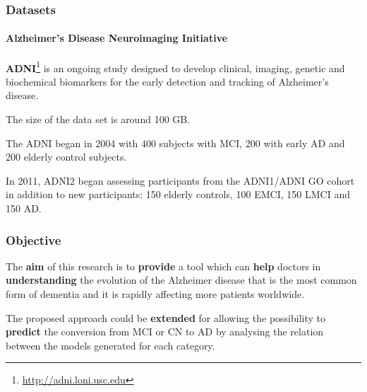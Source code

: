 \begin{frame}
	\frametitle{Datasets}
	\framesubtitle{Alzheimer's Disease Neuroimaging Initiative}
	
	\Large
	
	\textbf{ADNI}\footnote{\url{http://adni.loni.usc.edu}} is an ongoing study designed to develop
	clinical, imaging, genetic and biochemical biomarkers for the early detection and tracking of
	Alzheimer's disease.
	
	\vspace{0.15cm}
	
	The size of the data set is around 100 GB.
	
	\vspace{0.15cm}
	
	The ADNI began in 2004 with 400 subjects with MCI, 200 with early AD and 200 elderly control
	subjects.\\
	
	\vspace{0.15cm}
	
	In 2011, ADNI2 began assessing participants from the ADNI1/ADNI GO cohort in addition to new
	participants: 150 elderly controls, 100 EMCI, 150 LMCI and 150 AD. \\
\end{frame}

\begin{frame}
	\frametitle{Objective}
	
	\Large
	
	\vspace{0.3cm}
	
	The \textbf{aim} of this research is to \textbf{provide} a tool which can \textbf{help} doctors in
	\textbf{understanding} the evolution of the Alzheimer disease that is the most common form of
	dementia and it is rapidly affecting more patients worldwide.
	
	\vspace{0.4cm}
	
	The proposed approach could be \textbf{extended} for allowing the possibility to \textbf{predict}
	the conversion from MCI or CN to AD by analysing the relation between the models generated for each
	category. \\
\end{frame}
